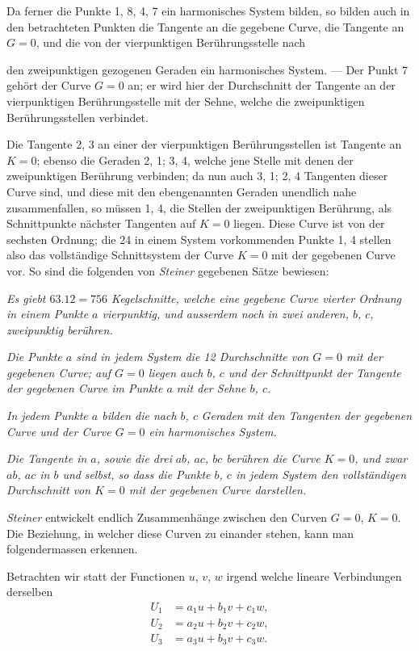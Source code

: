 \documentclass{article}
\begin{document}
Da ferner die Punkte 1, 8, 4, 7 ein harmonisches System bilden, so bilden auch in den betrachteten Punkten die Tangente an die gegebene Curve, die Tangente an $G=0$, und die von der vierpunktigen Berührungsstelle nach

den zweipunktigen gezogenen Geraden ein harmonisches System. --- Der Punkt 7 gehört der Curve $G=0$ an; er wird hier der Durchschnitt der Tangente an der vierpunktigen Berührungsstelle mit der Sehne, welche die zweipunktigen Berührungsstellen verbindet.

Die Tangente 2, 3 an einer der vierpunktigen Berührungsstellen ist Tangente an $K=0$; ebenso die Geraden 2, 1; 3, 4, welche jene Stelle mit denen der zweipunktigen Berührung verbinden; da nun auch 3, 1; 2, 4 Tangenten dieser Curve sind, und diese mit den ebengenannten Geraden unendlich nahe zusammenfallen, so müssen 1, 4, die Stellen der zweipunktigen Berührung, als Schnittpunkte nächster Tangenten auf $K=0$ liegen. Diese Curve ist von der sechsten Ordnung; die 24 in einem System vorkommenden Punkte 1, 4 stellen also das vollständige Schnittsystem der Curve $K=0$ mit der gegebenen Curve vor. So sind die folgenden von \emph{Steiner} gegebenen Sätze bewiesen:

\emph{Es giebt $63.12 = 756$ Kegelschnitte, welche eine gegebene Curve vierter Ordnung in einem Punkte $a$ vierpunktig, und ausserdem noch in zwei anderen, $b$, $c$, zweipunktig berühren.}

\emph{Die Punkte $a$ sind in jedem System die 12 Durchschnitte von $G=0$ mit der gegebenen Curve; auf $G=0$ liegen auch $b$, $c$ und der Schnittpunkt der Tangente der gegebenen Curve im Punkte $a$ mit der Sehne $b$, $c$.}

\emph{In jedem Punkte $a$ bilden die nach $b$, $c$}  \emph{Geraden mit den Tangenten der gegebenen Curve und der Curve $G=0$ ein harmonisches System.}

\emph{Die Tangente in $a$, sowie die drei}  \emph{$ab$, $ac$, $bc$ berühren die Curve $K=0$, und zwar $ab$, $ac$ in $b$ und}  \emph{selbst, so dass die Punkte $b$, $c$ in jedem System den vollständigen Durchschnitt von $K=0$ mit der gegebenen Curve darstellen.}

\emph{Steiner} entwickelt endlich Zusammenhänge zwischen den Curven $G=0$, $K=0$. Die Beziehung, in welcher diese Curven zu einander stehen, kann man folgendermassen erkennen.

Betrachten wir statt der Functionen $u$, $v$, $w$ irgend welche lineare Verbindungen derselben
\[
\begin{aligned}
U_{1} &= a_{1} u+b_{1} v+c_{1} w,\\
U_{2} &= a_{2} u+b_{2} v+c_{2} w,\\
U_{3} &= a_{3} u+b_{3} v+c_{3} w.
\end{aligned}
\]
\end{document}
